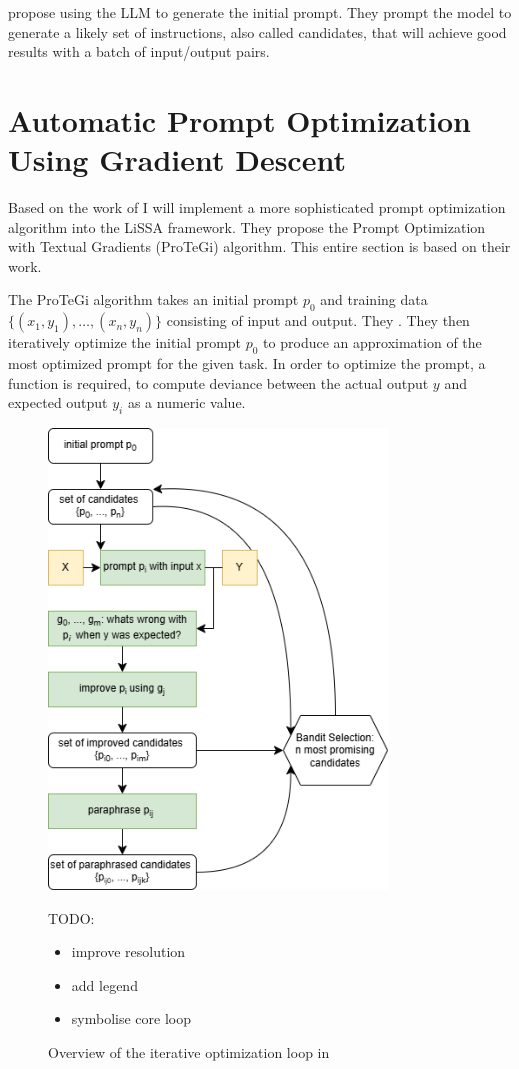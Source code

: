  propose using the LLM to generate the initial prompt. They prompt the model to generate a likely set of instructions, also called candidates, that will achieve good results with a batch of input/output pairs.




\section{Automatic Prompt Optimization Using Gradient Descent}
\label{sec:gradient_descent}
Based on the work of  I will implement a more sophisticated prompt optimization algorithm into the LiSSA framework. They propose the Prompt Optimization with Textual Gradients (ProTeGi) algorithm. This entire section is based on their work.

The ProTeGi algorithm takes an initial prompt $p_0$ and training data $\{(x_1, y_1), \dots, (x_n, y_n)\}$ consisting of input and output. They . They then iteratively optimize the initial prompt $p_0$ to produce an approximation of the most optimized prompt for the given task. In order to optimize the prompt, a function is required, to compute deviance between the actual output $y$ and expected output $y_i$ as a numeric value.

\begin{figure}[h]
\centering
\includegraphics[width=9cm]{graphics/gradient_descent.png}
\caption{Overview of the iterative optimization loop in \cite{pryzant2023AutomaticPrompt}}
\label{fig:gradient_descent}
TODO: 
\begin{itemize}
    \item improve resolution
    \item add legend
    \item symbolise core loop
\end{itemize}
\end{figure}


